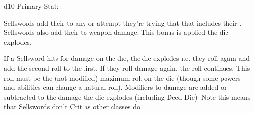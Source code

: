 {  





  \FLESH d10 \hfill Primary Stat: \VIG
  


  
  Sellswords add their \LVL to any \RO or \RB attempt they're trying that that includes their \VIG.  Sellswords also add their \LVL to weapon damage.  This bonus is applied   the die explodes.

  \cbreak


  If a Sellsword hits for \MAX damage on the die, the die explodes i.e. they roll again and add the second roll to the first.  If they roll \MAX damage again, the roll continues.  This roll must be the  (not modified) maximum roll on the die (though some powers and abilities can change a natural roll).  Modifiers to damage are added or subtracted to the damage   the die explodes (including Deed Die).  Note this means that Sellswords don't Crit as other classes do.

}
